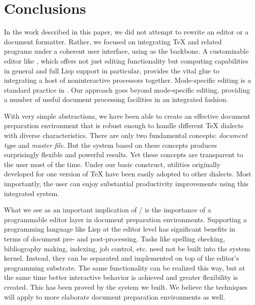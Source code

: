 

\section{Conclusions}
In the work described in this paper, we did not attempt
to rewrite an editor or a document formatter.  Rather, we focused on
integrating {\TeX} and related programs under a coherent user interface,
using {\emacs} as the backbone.
A customizable editor like {\emacs}, which offers not just editing
functionality but computing capabilities
in general and full Lisp support in particular, provides
the vital glue to integrating a host of noninteractive processors together.
Mode-specific editing is a standard practice in {\emacs}.
Our approach goes beyond mode-specific editing, providing a number of
useful document processing facilities in an integrated fashion.

With very simple abstractions, we have been able to create an effective
document preparation environment that is robust enough to handle
different {\TeX} dialects with diverse characteristics.  There are only two
fundamental concepts: {\it document type\/} and {\it master file\/}.
But the system based on these concepts produces surprisingly flexible
and powerful results.  Yet these concepts are transparent to the user
most of the time.  Under our basic construct,
utilities originally developed for one version of {\TeX} have been
easily adopted to other dialects.
Most importantly, the user can enjoy substantial productivity improvements
using this integrated system.

What we see as an important implication of {\TM}/{\BM} is the 
importance of a programmable editor layer in document
preparation environments.  Supporting a programming language like
Lisp at the editor level has significant benefits in terms of document
pre- and post-processing.  Tasks like spelling checking, bibliography
making, indexing, job control, etc. need not be built into the system kernel.
Instead, they can be separated and implemented on top of the editor's 
programming substrate.  The same functionality can be realized this way,
but at the same time better interactive behavior is achieved and
greater flexibility is created.
This has been proved by the system we built.  We believe the techniques
will apply to more elaborate document preparation environments as well.


